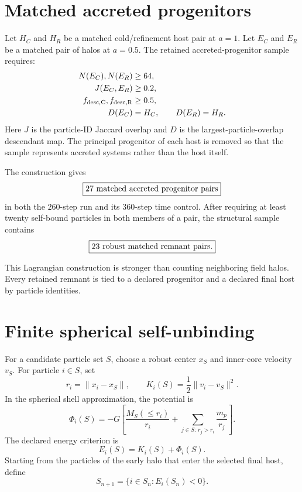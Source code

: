 \section{Matched accreted progenitors}

Let $H_C$ and $H_R$ be a matched cold/refinement host pair at $a=1$.  Let $E_C$ and $E_R$ be a matched pair of halos at $a=0.5$.  The retained accreted-progenitor sample requires:
\begin{align}
N(E_C),N(E_R)&\ge 64,\label{eq:sct-ninit}\\
J(E_C,E_R)&\ge0.2,\label{eq:sct-jaccard}\\
f_{\rm desc,C},f_{\rm desc,R}&\ge0.5,\label{eq:sct-desc}\\
D(E_C)&=H_C,\qquad D(E_R)=H_R.\label{eq:sct-desc-host}
\end{align}
Here $J$ is the particle-ID Jaccard overlap and $D$ is the largest-particle-overlap descendant map.  The principal progenitor of each host is removed so that the sample represents accreted systems rather than the host itself.

The construction gives
\begin{equation}
\boxed{27\ \text{matched accreted progenitor pairs}}
\label{eq:sct-candidate-count}
\end{equation}
in both the $260$-step run and its $360$-step time control.  After requiring at least twenty self-bound particles in both members of a pair, the structural sample contains
\begin{equation}
\boxed{23\ \text{robust matched remnant pairs}.}
\label{eq:sct-robust-count}
\end{equation}

This Lagrangian construction is stronger than counting neighboring field halos.  Every retained remnant is tied to a declared progenitor and a declared final host by particle identities.

\section{Finite spherical self-unbinding}

For a candidate particle set $S$, choose a robust center $x_S$ and inner-core velocity $v_S$.  For particle $i\in S$, set
\begin{equation}
r_i=\lVert x_i-x_S\rVert,
\qquad
K_i(S)=\frac12\lVert v_i-v_S\rVert^2.
\label{eq:sct-kinetic}
\end{equation}
In the spherical shell approximation, the potential is
\begin{equation}
\Phi_i(S)
=-G\left[
\frac{M_S(\le r_i)}{r_i}
+
\sum_{j\in S:\,r_j>r_i}\frac{m_p}{r_j}
\right].
\label{eq:sct-potential}
\end{equation}
The declared energy criterion is
\begin{equation}
E_i(S)=K_i(S)+\Phi_i(S).
\label{eq:sct-energy}
\end{equation}
Starting from the particles of the early halo that enter the selected final host, define
\begin{equation}
S_{n+1}
=
\{i\in S_n:E_i(S_n)<0\}.
\label{eq:sct-unbinding-map}
\end{equation}

